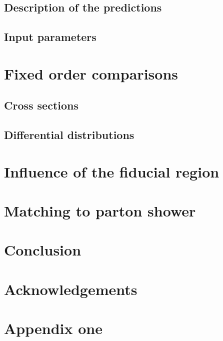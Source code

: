 \documentclass[11pt,epsf]{article}
\begin{document}
\subsection{Description of the predictions}



\subsection{Input parameters}



\section{Fixed order comparisons}

\subsection{Cross sections}



\subsection{Differential distributions}



\section{Influence of the fiducial region}

\section{Matching to parton shower}



\section{Conclusion}



\section*{Acknowledgements}



\appendix

\section{Appendix one}




\end{document}

